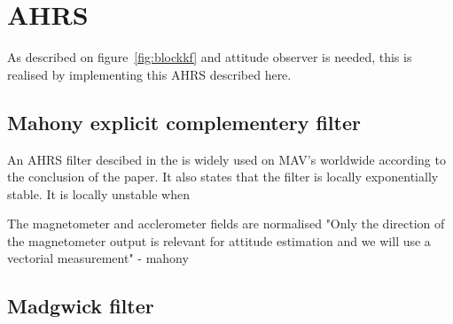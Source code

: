 \chapter{\acl{AHRS}}

\noindent As described on figure~\vref{fig:blockkf} and attitude observer is needed, this is realised by implementing this \ac{AHRS} described here.

\section{Mahony explicit complementery filter}
An \ac{AHRS} filter descibed in the \cite{mahony} is widely used on MAV's worldwide according to the conclusion of the paper. It also states that the filter is locally exponentially stable. It is locally unstable when 


The magnetometer and acclerometer fields are normalised
"Only the direction of the
magnetometer output is relevant for attitude estimation and
we will use a vectorial measurement" - mahony

\section{Madgwick filter}

